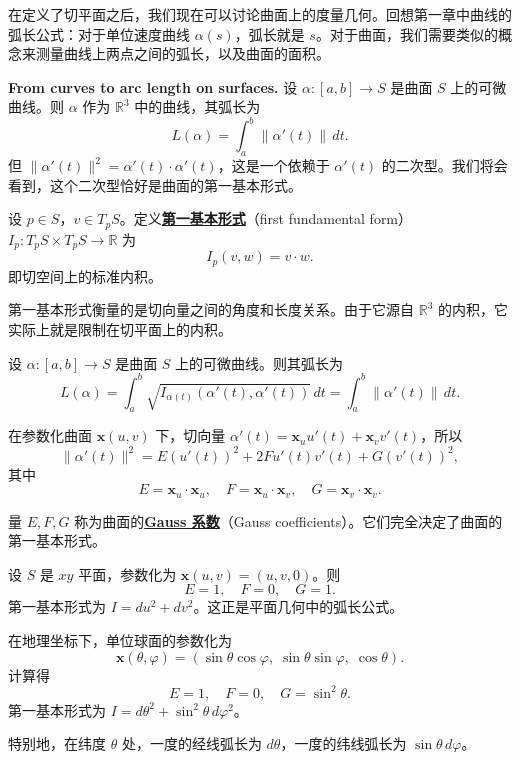 在定义了切平面之后，我们现在可以讨论曲面上的度量几何。回想第一章中曲线的弧长公式：对于单位速度曲线 $\alpha(s)$，弧长就是 $s$。对于曲面，我们需要类似的概念来测量曲线上两点之间的弧长，以及曲面的面积。

\textbf{From curves to arc length on surfaces.} 设 $\alpha: [a,b] \to S$ 是曲面 $S$ 上的可微曲线。则 $\alpha$ 作为 $\mathbb{R}^3$ 中的曲线，其弧长为
\[
L(\alpha) = \int_a^b \|\alpha'(t)\| \, dt.
\]
但 $\|\alpha'(t)\|^2 = \alpha'(t) \cdot \alpha'(t)$，这是一个依赖于 $\alpha'(t)$ 的二次型。我们将会看到，这个二次型恰好是曲面的第一基本形式。

\begin{Definition}[第一基本形式]\label{def:first-fundamental-form}
设 $p \in S$，$v \in T_pS$。定义\textbf{\underline{第一基本形式}}（first fundamental form）$I_p: T_pS \times T_pS \to \mathbb{R}$ 为
\[
I_p(v, w) = v \cdot w.
\]
即切空间上的标准内积。
\end{Definition}

第一基本形式衡量的是切向量之间的角度和长度关系。由于它源自 $\mathbb{R}^3$ 的内积，它实际上就是限制在切平面上的内积。

\begin{Proposition}[弧长公式]\label{prop:arc-length-first-form}
设 $\alpha: [a,b] \to S$ 是曲面 $S$ 上的可微曲线。则其弧长为
\[
L(\alpha) = \int_a^b \sqrt{I_{\alpha(t)}(\alpha'(t), \alpha'(t))} \, dt = \int_a^b \|\alpha'(t)\| \, dt.
\]
\end{Proposition}

在参数化曲面 $\mathbf{x}(u,v)$ 下，切向量 $\alpha'(t) = \mathbf{x}_u u'(t) + \mathbf{x}_v v'(t)$，所以
\[
\|\alpha'(t)\|^2 = E(u'(t))^2 + 2F u'(t) v'(t) + G(v'(t))^2,
\]
其中
\[
E = \mathbf{x}_u \cdot \mathbf{x}_u,\quad F = \mathbf{x}_u \cdot \mathbf{x}_v,\quad G = \mathbf{x}_v \cdot \mathbf{x}_v.
\]

\begin{Definition}[Gauss 系数]\label{def:gauss-coefficients}
量 $E, F, G$ 称为曲面的\textbf{\underline{Gauss 系数}}（Gauss coefficients）。它们完全决定了曲面的第一基本形式。
\end{Definition}

\begin{Example}[平面]\label{ex:plane-first-form}
设 $S$ 是 $xy$ 平面，参数化为 $\mathbf{x}(u,v) = (u,v,0)$。则
\[
E = 1,\quad F = 0,\quad G = 1.
\]
第一基本形式为 $I = du^2 + dv^2$。这正是平面几何中的弧长公式。
\end{Example}

\begin{Example}[球面]\label{ex:sphere-first-form}
在地理坐标下，单位球面的参数化为
\[
\mathbf{x}(\theta,\varphi) = (\sin\theta\cos\varphi,\; \sin\theta\sin\varphi,\; \cos\theta).
\]
计算得
\[
E = 1,\quad F = 0,\quad G = \sin^2\theta.
\]
第一基本形式为 $I = d\theta^2 + \sin^2\theta\, d\varphi^2$。

特别地，在纬度 $\theta$ 处，一度的经线弧长为 $d\theta$，一度的纬线弧长为 $\sin\theta\, d\varphi$。
\end{Example}

